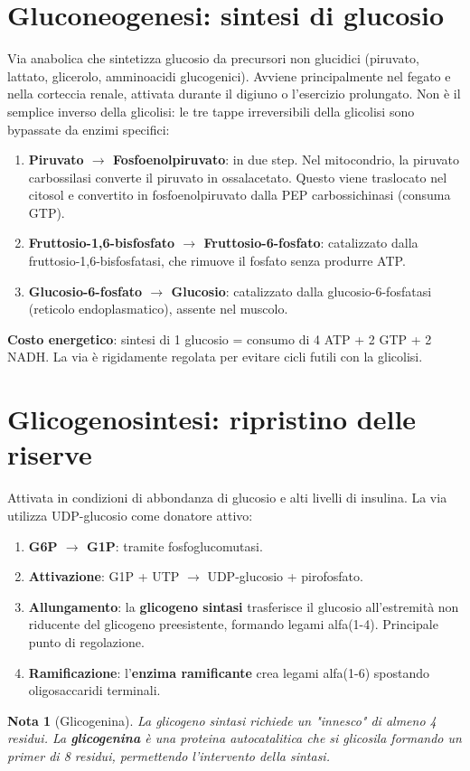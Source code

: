 \documentclass[12pt,a4paper]{report}
\newtheorem{nota}{Nota}[section]
\begin{document}
\section{Gluconeogenesi: sintesi di glucosio}
Via anabolica che sintetizza glucosio da precursori non glucidici (piruvato, lattato, glicerolo, amminoacidi glucogenici). Avviene principalmente nel fegato e nella corteccia renale, attivata durante il digiuno o l'esercizio prolungato.
Non è il semplice inverso della glicolisi: le tre tappe irreversibili della glicolisi sono bypassate da enzimi specifici:
\begin{enumerate}
\item \textbf{Piruvato $\rightarrow$ Fosfoenolpiruvato}: in due step. Nel mitocondrio, la piruvato carbossilasi converte il piruvato in ossalacetato. Questo viene traslocato nel citosol e convertito in fosfoenolpiruvato dalla PEP carbossichinasi (consuma GTP).
\item \textbf{Fruttosio-1,6-bisfosfato $\rightarrow$ Fruttosio-6-fosfato}: catalizzato dalla fruttosio-1,6-bisfosfatasi, che rimuove il fosfato senza produrre ATP.
\item \textbf{Glucosio-6-fosfato $\rightarrow$ Glucosio}: catalizzato dalla glucosio-6-fosfatasi (reticolo endoplasmatico), assente nel muscolo.
\end{enumerate}
\textbf{Costo energetico}: sintesi di 1 glucosio = consumo di 4 ATP + 2 GTP + 2 NADH. La via è rigidamente regolata per evitare cicli futili con la glicolisi.

\section{Glicogenosintesi: ripristino delle riserve}
Attivata in condizioni di abbondanza di glucosio e alti livelli di insulina. La via utilizza UDP-glucosio come donatore attivo:
\begin{enumerate}
\item \textbf{G6P $\rightarrow$ G1P}: tramite fosfoglucomutasi.
\item \textbf{Attivazione}: G1P + UTP $\rightarrow$ UDP-glucosio + pirofosfato.
\item \textbf{Allungamento}: la \textbf{glicogeno sintasi} trasferisce il glucosio all'estremità non riducente del glicogeno preesistente, formando legami alfa(1-4). Principale punto di regolazione.
\item \textbf{Ramificazione}: l'\textbf{enzima ramificante} crea legami alfa(1-6) spostando oligosaccaridi terminali.
\end{enumerate}
\begin{nota}[Glicogenina]
La glicogeno sintasi richiede un "innesco" di almeno 4 residui. La \textbf{glicogenina} è una proteina autocatalitica che si glicosila formando un primer di 8 residui, permettendo l'intervento della sintasi.
\end{nota}
\end{document}
